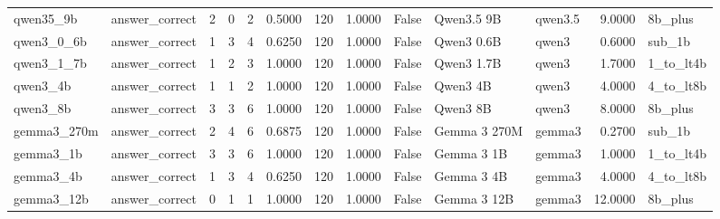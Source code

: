 \begin{tabular}{llrrrrrrrllrl}
qwen35_9b & answer_correct & 2 & 0 & 2 & 0.5000 & 120 & 1.0000 & False & Qwen3.5 9B & qwen3.5 & 9.0000 & 8b_plus \\
qwen3_0_6b & answer_correct & 1 & 3 & 4 & 0.6250 & 120 & 1.0000 & False & Qwen3 0.6B & qwen3 & 0.6000 & sub_1b \\
qwen3_1_7b & answer_correct & 1 & 2 & 3 & 1.0000 & 120 & 1.0000 & False & Qwen3 1.7B & qwen3 & 1.7000 & 1_to_lt4b \\
qwen3_4b & answer_correct & 1 & 1 & 2 & 1.0000 & 120 & 1.0000 & False & Qwen3 4B & qwen3 & 4.0000 & 4_to_lt8b \\
qwen3_8b & answer_correct & 3 & 3 & 6 & 1.0000 & 120 & 1.0000 & False & Qwen3 8B & qwen3 & 8.0000 & 8b_plus \\
gemma3_270m & answer_correct & 2 & 4 & 6 & 0.6875 & 120 & 1.0000 & False & Gemma 3 270M & gemma3 & 0.2700 & sub_1b \\
gemma3_1b & answer_correct & 3 & 3 & 6 & 1.0000 & 120 & 1.0000 & False & Gemma 3 1B & gemma3 & 1.0000 & 1_to_lt4b \\
gemma3_4b & answer_correct & 1 & 3 & 4 & 0.6250 & 120 & 1.0000 & False & Gemma 3 4B & gemma3 & 4.0000 & 4_to_lt8b \\
gemma3_12b & answer_correct & 0 & 1 & 1 & 1.0000 & 120 & 1.0000 & False & Gemma 3 12B & gemma3 & 12.0000 & 8b_plus \\
\bottomrule
\end{tabular}
